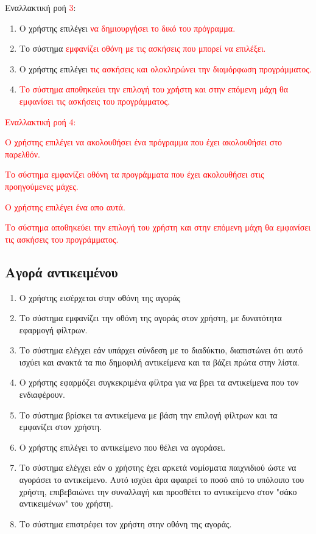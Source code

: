 Εναλλακτική ροή \textcolor{red}{3}:
\begin{enumerate}[label=5.\alph*.,ref=5.\alph*]
    \item Ο χρήστης επιλέγει \textcolor{red}{να δημιουργήσει το δικό του πρόγραμμα.}
    \item Το σύστημα \textcolor{red}{εμφανίζει οθόνη με τις ασκήσεις που μπορεί να επιλέξει.}
    \item Ο χρήστης επιλέγει \textcolor{red}{τις ασκήσεις και ολοκληρώνει την διαμόρφωση προγράμματος.}
    \item \textcolor{red}{Το σύστημα αποθηκεύει την επιλογή του χρήστη και στην επόμενη μάχη θα εμφανίσει τις ασκήσεις του προγράμματος.}
\end{enumerate}
\textcolor{red}{
Εναλλακτική ροή 4:
}
\begin{enumerate}[label=5.\alph*.,ref=5.\alph*]

    \item \textcolor{red}{Ο χρήστης επιλέγει να ακολουθήσει ένα πρόγραμμα που έχει ακολουθήσει στο παρελθόν.
    \item Το σύστημα εμφανίζει οθόνη τα προγράμματα που έχει ακολουθήσει στις προηγούμενες μάχες.
    \item Ο χρήστης επιλέγει ένα απο αυτά.
    \item Το σύστημα αποθηκεύει την επιλογή του χρήστη και στην επόμενη μάχη θα εμφανίσει τις ασκήσεις του προγράμματος.}
\end{enumerate}



\newpage
\subsection{Αγορά αντικειμένου}
\label{sec:buy}
\begin{enumerate}
    \item Ο χρήστης εισέρχεται στην οθόνη της αγοράς
     \item Το σύστημα εμφανίζει την οθόνη της αγοράς στον χρήστη, με δυνατότητα εφαρμογή φίλτρων.
    \item Το σύστημα ελέγχει εάν υπάρχει σύνδεση με το διαδύκτιο, διαπιστώνει ότι αυτό ισχύει και ανακτά τα πιο δημοφιλή αντικείμενα και τα βάζει πρώτα στην λίστα.
    \item Ο χρήστης εφαρμόζει συγκεκριμένα φίλτρα για να βρει τα αντικείμενα που τον ενδιαφέρουν.
    \item Το σύστημα βρίσκει τα αντικείμενα με βάση την επιλογή φίλτρων και τα εμφανίζει στον χρήστη.
    \item Ο χρήστης επιλέγει το αντικείμενο που θέλει να αγοράσει.
    \item Το σύστημα ελέγχει εάν ο χρήστης έχει αρκετά νομίσματα παιχνιδιού ώστε να αγοράσει το αντικείμενο. Αυτό ισχύει άρα αφαιρεί το ποσό από το υπόλοιπο του χρήστη, επιβεβαιώνει την συναλλαγή και προσθέτει το αντικείμενο στον "σάκο αντικειμένων" του χρήστη.
    \item Το σύστημα επιστρέφει τον χρήστη στην οθόνη της αγοράς.
\end{enumerate}

